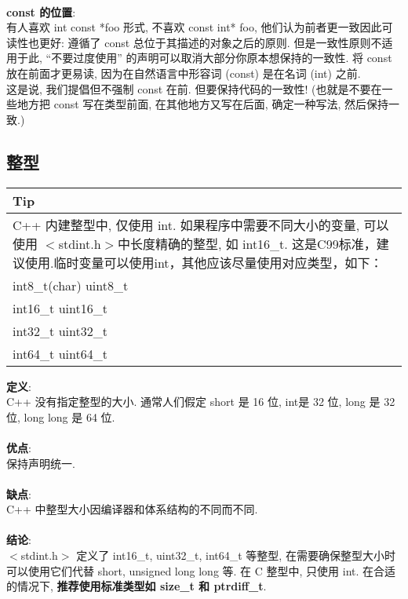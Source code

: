 \documentclass[a4paper,11pt,CJK]{article}
\begin{document}
\begin{CJK}{UTF8}{gbsn}
\\
\textbf{const 的位置}:\\
\indent 有人喜欢 int const *foo 形式, 不喜欢 const int* foo, 他们认为前者更一致因此可读性也更好: 遵循了 const 总位于其描述的对象之后的原则. 但是一致性原则不适用于此, ``不要过度使用'' 的声明可以取消大部分你原本想保持的一致性. 将 const 放在前面才更易读, 因为在自然语言中形容词 (const) 是在名词 (int) 之前.\\
\indent 这是说, 我们提倡但不强制 const 在前. 但要保持代码的一致性! (也就是不要在一些地方把 const 写在类型前面, 在其他地方又写在后面, 确定一种写法, 然后保持一致.)

\subsection{整型}
\begin{table}[htbp]
\flushleft
\begin{tabular}{p{400pt}}
\toprule
\rowcolor[gray]{.8} Tip \\
\midrule
C++ 内建整型中, 仅使用 int. 如果程序中需要不同大小的变量, 可以使用 $<$stdint.h$>$中长度精确的整型, 如 int16\_t. 这是C99标准，建议使用.临时变量可以使用int，其他应该尽量使用对应类型，如下：\\
\indent int8\_t(char) \qquad  uint8\_t\\
\indent int16\_t \qquad \qquad uint16\_t\\
\indent int32\_t \qquad \qquad uint32\_t\\
\indent int64\_t \qquad \qquad uint64\_t
\\
\bottomrule
\end{tabular}
\end{table}
\noindent
\textbf{定义}:\\
\indent C++ 没有指定整型的大小. 通常人们假定 short 是 16 位, int是 32 位, long 是 32 位, long long 是 64 位.\\
\\
\textbf{优点}:\\
\indent 保持声明统一.\\
\\
\textbf{缺点}:\\
\indent C++ 中整型大小因编译器和体系结构的不同而不同.\\
\\
\textbf{结论}:\\
\indent $<$stdint.h$>$ 定义了 int16\_t, uint32\_t, int64\_t 等整型, 在需要确保整型大小时可以使用它们代替 short, unsigned long long 等. 在 C 整型中, 只使用 int. 在合适的情况下, \textbf{推荐使用标准类型如 size\_t 和 ptrdiff\_t}.\\

\end{CJK}
\end{document}
